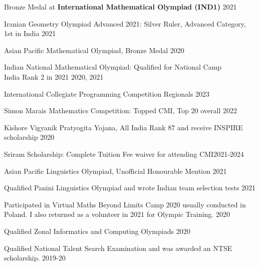 \documentclass[margin,line, 10pt]{res}
\begin{document}
\begin{resume}
\vspace*{-2.5mm}
Bronze Medal at {\bf International Mathematical Olympiad (IND1)} \hfill 2021

\vspace*{-2.5mm}
Iranian Geometry Olympiad Advanced 2021: Silver Ruler, Advanced Category, 1st in India \hfill 2021

\vspace*{-2.5mm}
Asian Pacific Mathematical Olympiad, Bronze Medal \hfill 2020

\vspace*{-2.5mm}
Indian National Mathematical Olympiad: Qualified for National Camp\\ India Rank 2 in 2021 \hfill 2020, 2021

\vspace*{-2.5mm}
International Collegiate Programming Competition Regionals \hfill 2023
 
\vspace*{-2.5mm}
Simon Marais Mathematics Competition: Topped CMI, Top 20 overall \hfill 2022

\vspace*{-2.5mm}
Kishore Vigyanik Pratyogita Yojana, All India Rank 87 and receive INSPIRE scholarship \hfill 2020

\vspace*{-2.5mm}
Sriram Scholarship: Complete Tuition Fee waiver for attending CMI\hfill 2021-2024

\vspace*{-2.5mm}
Asian Pacific Linguistics Olympiad, Unofficial Honourable Mention \hfill 2021

\vspace*{-2.5mm}
Qualified Panini Linguistics Olympiad and wrote Indian team selection tests \hfill{2021}

\vspace*{-2.5mm}
Participated in Virtual Maths Beyond Limits Camp 2020 usually conducted in Poland. I also returned as a volunteer in 2021 for Olympic Training. \hfill 2020

\vspace*{-2.5mm}
Qualified Zonal Informatics and Computing Olympiads \hfill 2020

\vspace*{-2.5mm}
Qualified National Talent Search Examination and was awarded an NTSE scholarship. \hfill 2019-20

\end{resume}
\end{document}

